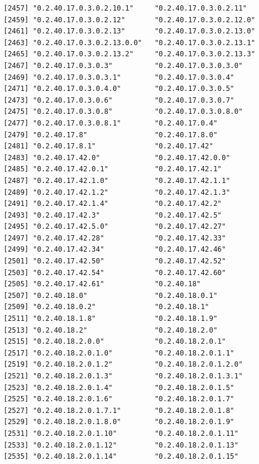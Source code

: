 \documentclass[
  letterpaper,
  DIV=11,
  numbers=noendperiod]{scrreprt}
\begin{document}
\begin{verbatim}
[2457] "0.2.40.17.0.3.0.2.10.1"     "0.2.40.17.0.3.0.2.11"      
[2459] "0.2.40.17.0.3.0.2.12"       "0.2.40.17.0.3.0.2.12.0"    
[2461] "0.2.40.17.0.3.0.2.13"       "0.2.40.17.0.3.0.2.13.0"    
[2463] "0.2.40.17.0.3.0.2.13.0.0"   "0.2.40.17.0.3.0.2.13.1"    
[2465] "0.2.40.17.0.3.0.2.13.2"     "0.2.40.17.0.3.0.2.13.3"    
[2467] "0.2.40.17.0.3.0.3"          "0.2.40.17.0.3.0.3.0"       
[2469] "0.2.40.17.0.3.0.3.1"        "0.2.40.17.0.3.0.4"         
[2471] "0.2.40.17.0.3.0.4.0"        "0.2.40.17.0.3.0.5"         
[2473] "0.2.40.17.0.3.0.6"          "0.2.40.17.0.3.0.7"         
[2475] "0.2.40.17.0.3.0.8"          "0.2.40.17.0.3.0.8.0"       
[2477] "0.2.40.17.0.3.0.8.1"        "0.2.40.17.0.4"             
[2479] "0.2.40.17.8"                "0.2.40.17.8.0"             
[2481] "0.2.40.17.8.1"              "0.2.40.17.42"              
[2483] "0.2.40.17.42.0"             "0.2.40.17.42.0.0"          
[2485] "0.2.40.17.42.0.1"           "0.2.40.17.42.1"            
[2487] "0.2.40.17.42.1.0"           "0.2.40.17.42.1.1"          
[2489] "0.2.40.17.42.1.2"           "0.2.40.17.42.1.3"          
[2491] "0.2.40.17.42.1.4"           "0.2.40.17.42.2"            
[2493] "0.2.40.17.42.3"             "0.2.40.17.42.5"            
[2495] "0.2.40.17.42.5.0"           "0.2.40.17.42.27"           
[2497] "0.2.40.17.42.28"            "0.2.40.17.42.33"           
[2499] "0.2.40.17.42.34"            "0.2.40.17.42.46"           
[2501] "0.2.40.17.42.50"            "0.2.40.17.42.52"           
[2503] "0.2.40.17.42.54"            "0.2.40.17.42.60"           
[2505] "0.2.40.17.42.61"            "0.2.40.18"                 
[2507] "0.2.40.18.0"                "0.2.40.18.0.1"             
[2509] "0.2.40.18.0.2"              "0.2.40.18.1"               
[2511] "0.2.40.18.1.8"              "0.2.40.18.1.9"             
[2513] "0.2.40.18.2"                "0.2.40.18.2.0"             
[2515] "0.2.40.18.2.0.0"            "0.2.40.18.2.0.1"           
[2517] "0.2.40.18.2.0.1.0"          "0.2.40.18.2.0.1.1"         
[2519] "0.2.40.18.2.0.1.2"          "0.2.40.18.2.0.1.2.0"       
[2521] "0.2.40.18.2.0.1.3"          "0.2.40.18.2.0.1.3.1"       
[2523] "0.2.40.18.2.0.1.4"          "0.2.40.18.2.0.1.5"         
[2525] "0.2.40.18.2.0.1.6"          "0.2.40.18.2.0.1.7"         
[2527] "0.2.40.18.2.0.1.7.1"        "0.2.40.18.2.0.1.8"         
[2529] "0.2.40.18.2.0.1.8.0"        "0.2.40.18.2.0.1.9"         
[2531] "0.2.40.18.2.0.1.10"         "0.2.40.18.2.0.1.11"        
[2533] "0.2.40.18.2.0.1.12"         "0.2.40.18.2.0.1.13"        
[2535] "0.2.40.18.2.0.1.14"         "0.2.40.18.2.0.1.15"        

\end{verbatim}
\end{document}
